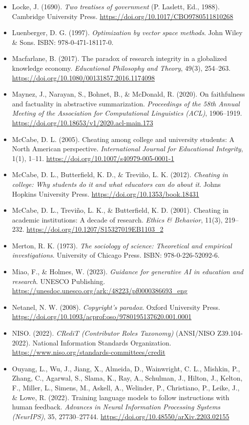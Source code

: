 \begin{itemize}[leftmargin=1.5em, label={}, itemsep=0.22ex, parsep=0pt]
\item Locke, J. (1690). \textit{Two treatises of government} (P. Laslett, Ed., 1988). Cambridge University Press. \url{https://doi.org/10.1017/CBO9780511810268}
\item Luenberger, D. G. (1997). \textit{Optimization by vector space methods}. John Wiley \& Sons. ISBN: 978-0-471-18117-0.
\item Macfarlane, B. (2017). The paradox of research integrity in a globalized knowledge economy. \textit{Educational Philosophy and Theory}, 49(3), 254--263. \url{https://doi.org/10.1080/00131857.2016.1174098}
\item Maynez, J., Narayan, S., Bohnet, B., \& McDonald, R. (2020). On faithfulness and factuality in abstractive summarization. \textit{Proceedings of the 58th Annual Meeting of the Association for Computational Linguistics (ACL)}, 1906--1919. \url{https://doi.org/10.18653/v1/2020.acl-main.173}
\item McCabe, D. L. (2005). Cheating among college and university students: A North American perspective. \textit{International Journal for Educational Integrity}, 1(1), 1--11. \url{https://doi.org/10.1007/s40979-005-0001-1}
\item McCabe, D. L., Butterfield, K. D., \& Treviño, L. K. (2012). \textit{Cheating in college: Why students do it and what educators can do about it}. Johns Hopkins University Press. \url{https://doi.org/10.1353/book.18431}
\item McCabe, D. L., Treviño, L. K., \& Butterfield, K. D. (2001). Cheating in academic institutions: A decade of research. \textit{Ethics \& Behavior}, 11(3), 219--232. \url{https://doi.org/10.1207/S15327019EB1103_2}
\item Merton, R. K. (1973). \textit{The sociology of science: Theoretical and empirical investigations}. University of Chicago Press. ISBN: 978-0-226-52092-6.
\item Miao, F., \& Holmes, W. (2023). \textit{Guidance for generative AI in education and research}. UNESCO Publishing. \url{https://unesdoc.unesco.org/ark:/48223/pf0000386693_eng}
\item Netanel, N. W. (2008). \textit{Copyright's paradox}. Oxford University Press. \url{https://doi.org/10.1093/acprof:oso/9780195137620.001.0001}
\item NISO. (2022). \textit{CRediT (Contributor Roles Taxonomy)} (ANSI/NISO Z39.104-2022). National Information Standards Organization. \url{https://www.niso.org/standards-committees/credit}
\item Ouyang, L., Wu, J., Jiang, X., Almeida, D., Wainwright, C. L., Mishkin, P., Zhang, C., Agarwal, S., Slama, K., Ray, A., Schulman, J., Hilton, J., Kelton, F., Miller, L., Simens, M., Askell, A., Welinder, P., Christiano, P., Leike, J., \& Lowe, R. (2022). Training language models to follow instructions with human feedback. \textit{Advances in Neural Information Processing Systems (NeurIPS)}, 35, 27730--27744. \url{https://doi.org/10.48550/arXiv.2203.02155}

\end{itemize}
